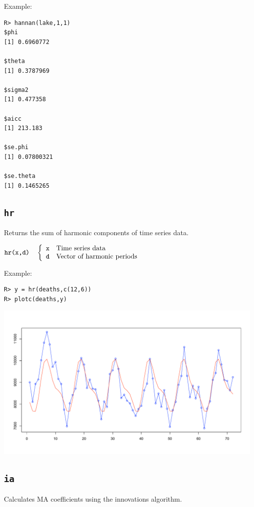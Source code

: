 \documentclass[11pt]{article}
\begin{document}
\noindent
Example:
\begin{verbatim}
R> hannan(lake,1,1)
$phi
[1] 0.6960772

$theta
[1] 0.3787969

$sigma2
[1] 0.477358

$aicc
[1] 213.183

$se.phi
[1] 0.07800321

$se.theta
[1] 0.1465265
\end{verbatim}

\newpage

\subsection{\tt hr}
Returns the sum of harmonic components of time series data.

\bigskip
$
\hbox{\tt hr(x,d)}\quad\left\{\begin{array}{ll}
{\tt x} & \hbox{Time series data}\\
{\tt d} & \hbox{Vector of harmonic periods}
\end{array}\right.
$

\bigskip
\noindent
Example:
\begin{verbatim}
R> y = hr(deaths,c(12,6))
R> plotc(deaths,y)
\end{verbatim}

\begin{center}
\includegraphics[scale=0.3]{Rplot-12.pdf}
\end{center}

\newpage

\subsection{\tt ia}
Calculates MA coefficients using the innovations algorithm.
\end{document}
